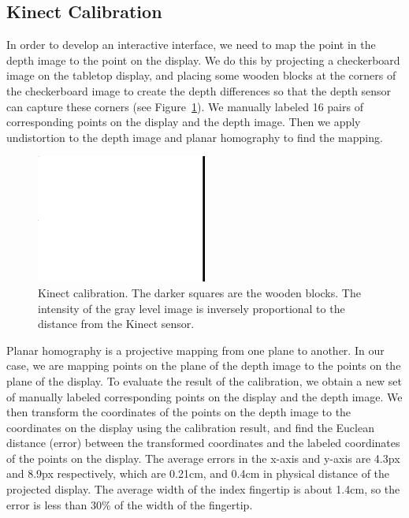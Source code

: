 \subsection{Kinect Calibration}
In order to develop an interactive interface, we need to map the point in the
depth image to the point on the display. We do this by projecting a
checkerboard image on the tabletop display, and placing some wooden blocks at
the corners of the checkerboard image to create the depth differences so that 
the depth sensor can capture these corners (see Figure~\ref{fig:calibration}).
We manually labeled 16 pairs of corresponding points on the display and the depth image. Then we
apply undistortion to the depth image and planar homography to find the mapping.

\begin{figure}[h]
  \centering
  \includegraphics[width=0.5\textwidth]{figures/calibration.png} 
  \caption{Kinect calibration. The darker squares are the wooden blocks. The
  intensity of the gray level image is inversely proportional to the distance
  from the Kinect sensor.}
  \label{fig:calibration}
\end{figure}

Planar homography is a projective mapping from one plane to another. In our
case, we are mapping points on the plane of the depth image to the points
on the plane of the display. To evaluate the result of the calibration, we
obtain a new set of manually labeled corresponding points on the display and the
depth image. We then transform the coordinates of the points on the depth image
to the coordinates on the display using the calibration result, and find the
Euclean distance (error) between the transformed coordinates and the labeled
coordinates of the points on the display. The average errors in the x-axis and
y-axis are 4.3px and 8.9px respectively, which are 0.21cm, and 0.4cm in physical distance of the
projected display. The average width of the index fingertip is about 1.4cm, so
the error is less than 30\% of the width of the fingertip. 

